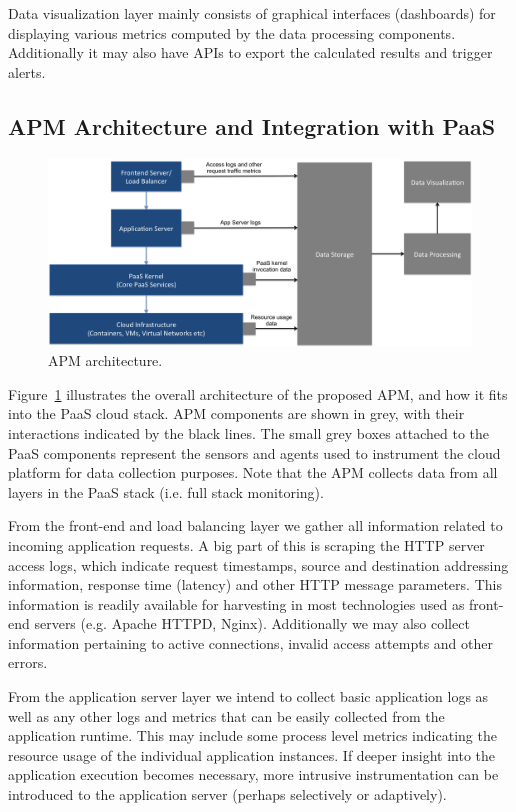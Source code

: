 \documentclass[11pt]{article}
\begin{document}
Data visualization layer mainly consists of graphical interfaces (dashboards) for displaying various
metrics computed by the data processing components. Additionally it may also have APIs to export
the calculated results and trigger alerts. 

\subsection{APM Architecture and Integration with PaaS}
\begin{figure}
\centering
\includegraphics[scale=0.35]{apm_architecture}
\caption{APM architecture.}
\label{fig:apm_architecture}
\end{figure}

Figure~\ref{fig:apm_architecture} illustrates the overall architecture of the proposed APM, and how 
it fits into the PaaS cloud stack. APM components are shown in grey, with their interactions indicated
by the black lines. The small grey boxes attached to the PaaS components represent the sensors and
agents used to instrument the cloud platform for data collection purposes. Note that the APM collects
data from all layers in the PaaS stack (i.e. full stack monitoring).

From the front-end and load balancing layer we gather all information related to incoming application
requests. A big part of this is scraping the HTTP server access logs, which indicate request timestamps,
source and destination addressing information, response time (latency) and other HTTP message
parameters. This information is readily available for harvesting in most technologies used as front-end
servers (e.g. Apache HTTPD, Nginx). Additionally we may also collect information pertaining to active
connections, invalid access attempts and other errors.

From the application server layer we intend to collect basic application logs as well as any other logs and 
metrics that can be easily collected from the application runtime. This may include some process level
metrics indicating the resource usage of the individual application instances. If deeper insight into the 
application execution becomes necessary, more intrusive instrumentation can be introduced to the 
application server (perhaps selectively or adaptively). 
\end{document}
